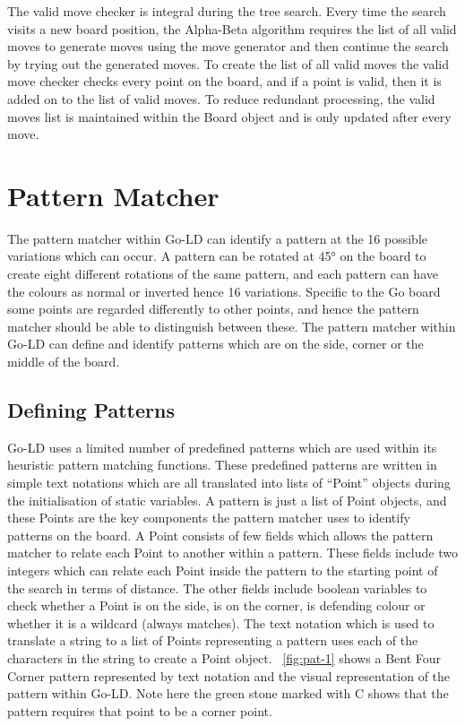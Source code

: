 \documentclass{l4proj}
\begin{document}
The valid move checker is integral during the tree search. Every time the search visits a new board position, the Alpha-Beta algorithm requires the list of all valid moves to generate moves using the move generator and then continue the search by trying out the generated moves. To create the list of all valid moves the valid move checker checks every point on the board, and if a point is valid, then it is added on to the list of valid moves. To reduce redundant processing, the valid moves list is maintained within the Board object and is only updated after every move.

\section{Pattern Matcher}
The pattern matcher within Go-LD can identify a pattern at the 16 possible variations which can occur. A pattern can be rotated at 45° on the board to create eight different rotations of the same pattern, and each pattern can have the colours as normal or inverted hence 16 variations. Specific to the Go board some points are regarded differently to other points, and hence the pattern matcher should be able to distinguish between these. The pattern matcher within Go-LD can define and identify patterns which are on the side, corner or the middle of the board.

\subsection{Defining Patterns}
Go-LD uses a limited number of predefined patterns which are used within its heuristic pattern matching functions. These predefined patterns are written in simple text notations which are all translated into lists of “Point” objects during the initialisation of static variables. A pattern is just a list of Point objects, and these Points are the key components the pattern matcher uses to identify patterns on the board. A Point consists of few fields which allows the pattern matcher to relate each Point to another within a pattern. These fields include two integers which can relate each Point inside the pattern to the starting point of the search in terms of distance. The other fields include boolean variables to check whether a Point is on the side, is on the corner, is defending colour or whether it is a wildcard (always matches). The text notation which is used to translate a string to a list of Points representing a pattern uses each of the characters in the string to create a Point object. ~\autoref{fig:pat-1} shows a Bent Four Corner pattern represented by text notation and the visual representation of the pattern within Go-LD. Note here the green stone marked with C shows that the pattern requires that point to be a corner point.
\end{document}
